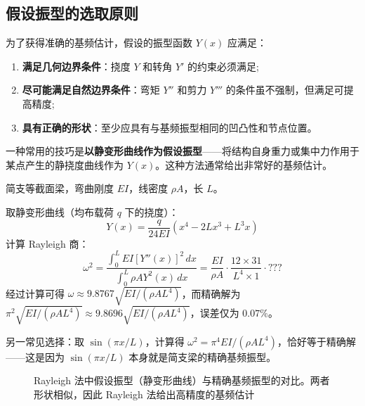 \subsection{假设振型的选取原则}

为了获得准确的基频估计，假设的振型函数 $Y(x)$ 应满足：

\begin{enumerate}
    \item \textbf{满足几何边界条件}：挠度 $Y$ 和转角 $Y'$ 的约束必须满足;
    \item \textbf{尽可能满足自然边界条件}：弯矩 $Y''$ 和剪力 $Y'''$ 的条件虽不强制，但满足可提高精度;
    \item \textbf{具有正确的形状}：至少应具有与基频振型相同的凹凸性和节点位置。
\end{enumerate}

一种常用的技巧是\textbf{以静变形曲线作为假设振型}——将结构自身重力或集中力作用于某点产生的静挠度曲线作为 $Y(x)$。这种方法通常给出非常好的基频估计。

\begin{example}
简支等截面梁，弯曲刚度 $EI$，线密度 $\rho A$，长 $L$。

取静变形曲线（均布载荷 $q$ 下的挠度）：
\[
Y(x) = \frac{q}{24EI}(x^4 - 2Lx^3 + L^3 x)
\]
计算 Rayleigh 商：
\[
\omega^2 = \frac{\int_0^L EI[Y''(x)]^2\,dx}{\int_0^L \rho A Y^2(x)\,dx}
    = \frac{EI}{\rho A}\cdot\frac{12\times 31}{L^4\times 1} \cdot ??? 
\]
经过计算可得 $\omega \approx 9.8767\sqrt{EI/(\rho A L^4)}$，而精确解为 $\pi^2\sqrt{EI/(\rho A L^4)} \approx 9.8696\sqrt{EI/(\rho A L^4)}$，误差仅为 $0.07\%$。
\end{example}

另一常见选择：取 $\sin(\pi x/L)$，计算得 $\omega^2 = \pi^4 EI/(\rho A L^4)$，恰好等于精确解——这是因为 $\sin(\pi x/L)$ 本身就是简支梁的精确基频振型。

\begin{figure}[H]\centering
{}
\caption{Rayleigh 法中假设振型（静变形曲线）与精确基频振型的对比。两者形状相似，因此 Rayleigh 法给出高精度的基频估计}
\label{fig:rayleigh-modes}
\end{figure}

